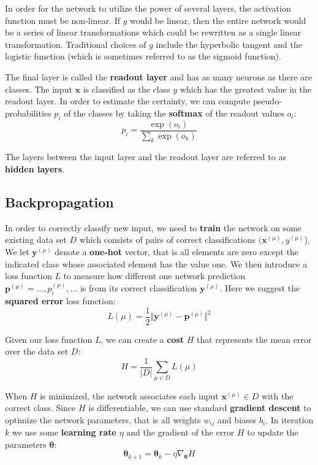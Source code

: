 In order for the network to utilize the power of several layers, the activation function must be non-linear. If $g$ would be linear, then the entire network would be a series of linear transformations which could be rewritten as a single linear transformation. Traditional choices of $g$ include the hyperbolic tangent and the logistic function (which is sometimes referred to as the sigmoid function).

The final layer is called the \textbf{readout layer} and has as many neurons as there are classes. The input $\mathbf{x}$ is classified as the class $y$ which has the greatest value in the readout layer. In order to estimate the certainty, we can compute pseudo-probabilities $p_i$ of the classes by taking the \textbf{softmax} of the readout values $o_i$:
\[
p_i = \frac{ \exp(o_i) }{ \sum_k \exp(o_k) }
\]

The layers between the input layer and the readout layer are referred to as \textbf{hidden layers}.

\subsection{Backpropagation} \label{sssec:BackProp}

In order to correctly classify new input, we need to \textbf{train} the network on some existing data set $D$ which consists of pairs of correct classifications $(\mathbf{x}^{(\mu)}, y^{(\mu)}$).
We let $\mathbf{y}^{(\mu)}$ denote a \textbf{one-hot} vector, that is all elements are zero except the indicated class whose associated element has the value one.
We then introduce a loss function $L$ to measure how different one network prediction $\mathbf{p}^{(\mu)}={\ldots, p_i^{(\mu)}, \ldots}$ is from its correct classification $\mathbf{y}^{(\mu)}$. Here we suggest the \textbf{squared error} loss function:
\[
L(\mu) = \frac{1}{2} \Vert
  \mathbf{y}^{(\mu)} - \mathbf{p}^{(\mu)}
\Vert ^2
\]

Given our loss function $L$, we can create a \textbf{cost} $H$ that represents the mean error over the data set $D$:
\[
H = \frac{1}{\vert D \vert} \sum_{\mu \in D} L(\mu)
\]

When $H$ is minimized, the network associates each input $\mathbf{x}^{(\mu)} \in D$ with the correct class. Since $H$ is differentiable, we can use standard \textbf{gradient descent} to optimize the network parameters, that is all weights $w_{ij}$ and biases $b_i$.
In iteration $k$ we use some \textbf{learning rate} $\eta$ and the gradient of the error $H$ to update the parameters $\mathbf{\theta}$:
\[
\mathbf{\theta}_{k+1} =
\mathbf{\theta}_k - \eta \nabla_{\mathbf{\theta}} H
\]


